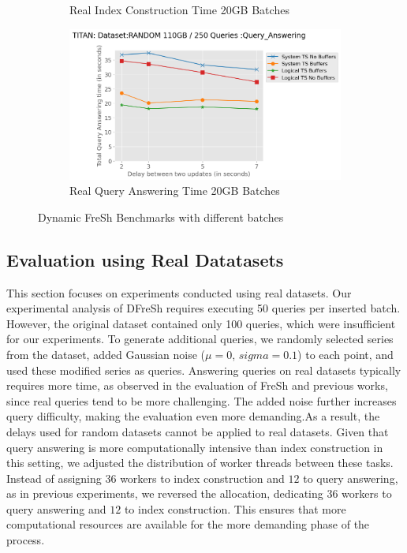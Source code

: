 \begin{figure}
\begin{subfigure}[c]{0.45\textwidth}
		\caption{Real Index Construction Time 20GB Batches}
		\label{fig:actual-index-Construction-time-20GB}
	\end{subfigure}
	\begin{subfigure}[c]{0.45\textwidth}
		\includegraphics[width=1\textwidth]	 {figures/Experiments/Dynamic/20GB/dataset_115343360_lockfree_Messi_Results_query_answering_initial[10485760]_delays_20GB.png}
		\caption{Real Query Answering Time 20GB Batches}
		\label{fig:actual-query-answering-time-20GB}
	\end{subfigure}
	\caption{Dynamic FreSh Benchmarks with different batches}
	\label{fig:dfresh-fresh-random-different-batches}
\end{figure}


\clearpage
\subsection{Evaluation using Real Datatasets}

This section focuses on experiments conducted using real datasets. Our
experimental analysis of DFreSh requires executing 50 queries per inserted
batch. However, the original dataset contained only 100 queries, which were
insufficient for our experiments. To generate additional queries, we randomly
selected series from the dataset, added Gaussian noise 
($\mu = 0$, $sigma = 0.1$) to each point, and used these modified series 
as queries. Answering queries on real datasets typically requires more time,
as observed in the evaluation of FreSh and previous works, since real queries
tend to be more challenging. The added noise further increases query difficulty,
making the evaluation even more demanding.As a result, the delays used for 
random datasets cannot be applied to real datasets. 
Given that query answering is more computationally intensive than index
construction in this setting, we adjusted the distribution of worker threads
between these tasks. Instead of assigning $36$ workers to index construction
and $12$ to query answering, as in previous experiments, we reversed the
allocation, dedicating $36$ workers to query answering and $12$ to index
construction. This ensures that more computational resources are available
for the more demanding phase of the process.

